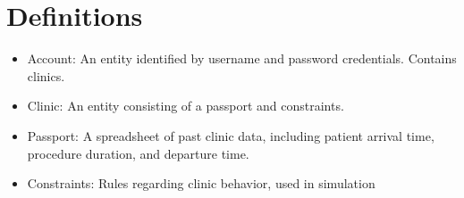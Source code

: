 \documentclass[12pt]{article}
\begin{document}
\section{Definitions}
\begin{itemize}
\item Account:  An entity identified by username and password credentials. Contains clinics. 
\item Clinic: An entity consisting of a passport and constraints.
\item Passport: A spreadsheet of past clinic data, including patient arrival time, procedure duration, and departure time.
\item Constraints: Rules regarding clinic behavior, used in simulation
\end{itemize}
\end{document}
